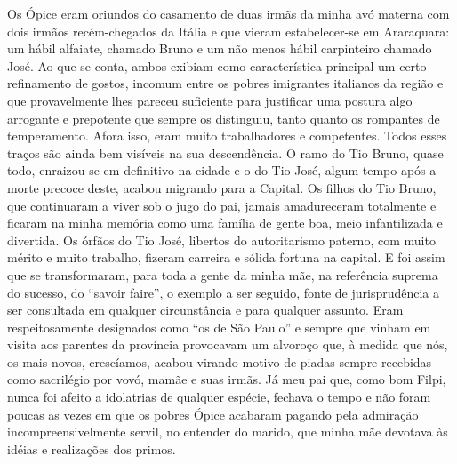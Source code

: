 Os Ópice eram oriundos do casamento de duas irmãs da minha avó materna com dois irmãos recém-chegados da Itália e que vieram estabelecer-se em Araraquara: um hábil alfaiate, chamado Bruno e um não menos hábil carpinteiro chamado José. 
Ao que se conta, ambos exibiam como característica principal um certo refinamento de gostos, incomum entre os pobres imigrantes italianos da região e que provavelmente lhes pareceu suficiente para justificar uma postura algo arrogante e prepotente que sempre os distinguiu, tanto quanto os rompantes de temperamento. 
Afora isso, eram muito trabalhadores e competentes. Todos esses traços são ainda bem visíveis na sua descendência. 
O ramo do Tio Bruno, quase todo, enraizou-se em definitivo na cidade e o do Tio José, algum tempo após a morte precoce deste, acabou migrando para a Capital. 
Os filhos do Tio Bruno, que continuaram a viver sob o jugo do pai, jamais amadureceram totalmente e ficaram na minha memória como uma família de gente boa, meio infantilizada e divertida. 
Os órfãos do Tio José, libertos do autoritarismo paterno, com muito mérito e muito trabalho, fizeram carreira e sólida fortuna na capital. 
E foi assim que se transformaram, para toda a gente da minha mãe, na referência suprema do sucesso, do “savoir faire”, o exemplo a ser seguido, fonte de jurisprudência a ser consultada em qualquer circunstância e para qualquer assunto. 
Eram respeitosamente designados como “os de São Paulo” e sempre que vinham em visita aos parentes da província provocavam um alvoroço que, à medida que nós, os mais novos, crescíamos, acabou virando motivo de piadas sempre recebidas como sacrilégio por vovó, mamãe e suas irmãs. 
Já meu pai que, como bom Filpi, nunca foi afeito a idolatrias de qualquer espécie, fechava o tempo e não foram poucas as vezes em que os pobres Ópice acabaram pagando pela admiração incompreensivelmente servil, no entender do marido, que minha mãe devotava às idéias e realizações dos primos.